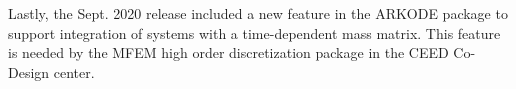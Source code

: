 Lastly, the Sept. 2020 release included a new feature in the ARKODE package to support integration of systems with a time-dependent mass matrix.  This feature is needed by the MFEM high order discretization package in the CEED Co-Design center.




